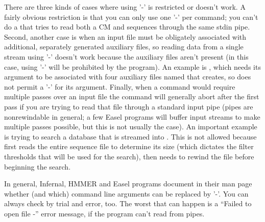 There are three kinds of cases where using '-' is restricted or
doesn't work. A fairly obvious restriction is that you can only use
one '-' per command; you can't do a  that tries to
read both a CM and sequences through the same stdin
pipe. Second, another case is when an input file must be obligately
associated with additional, separately generated auxiliary files, so
reading data from a single stream using '-' doesn't work because the
auxiliary files aren't present (in this case, using '-' will be
prohibited by the program). An example is , which needs
its  argument to be associated with four auxiliary
files named  that  creates,
so  does not permit a '-' for its 
argument. Finally, when a command would require multiple passes over
an input file the command will generally abort after the first pass
if you are trying to read that file through a standard input pipe
(pipes are nonrewindable in general; a few Easel programs
will buffer input streams to make multiple passes possible, but this
is not usually the case). An important example is trying to search a
database that is streamed into . This is not allowed
because  first reads the entire sequence file to
determine its size (which dictates the filter thresholds that will be
used for the search), then needs to rewind the file before beginning
the search.

In general, Infernal, HMMER and Easel programs document in their man page
whether (and which) command line arguments can be replaced by '-'.
You can always check by trial and error, too. The worst that can
happen is a ``Failed to open file -'' error message, if the program
can't read from pipes.


